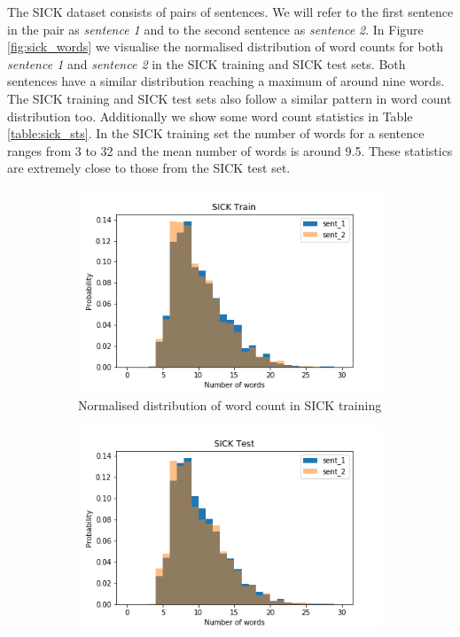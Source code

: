 \begin{enumerate}
The SICK dataset consists of pairs of sentences. We will refer to the first sentence in the pair as \emph{sentence 1} and to the second sentence as \emph{sentence 2}. In Figure \ref{fig:sick_words} we visualise the normalised distribution of word counts for both \emph{sentence 1} and \emph{sentence 2} in the SICK training and SICK test sets. Both sentences have a similar distribution reaching a maximum of around nine words. The SICK training and SICK test sets also follow a similar pattern in word count distribution too. Additionally we show some word count statistics in Table \ref{table:sick_sts}. In the SICK training set the number of words for a sentence ranges from 3 to 32 and the mean number of words is around 9.5. These statistics are extremely close to those from the SICK test set. 


\begin{figure}
	\captionsetup[subfigure]{justification=centering}
	\centering
	\begin{subfigure}[b]{.5\textwidth}
		\centering
		\includegraphics[width=\textwidth]{figures/semantic_textual_similarity/introduction/sick_train_words.png}
		\caption{Normalised distribution of word count in SICK training}
		\label{fig:sick_train_words}
	\end{subfigure}%
	\begin{subfigure}[b]{.5\textwidth}
		\centering
		\includegraphics[width=\textwidth]{figures/semantic_textual_similarity/introduction/sick_test_words.png}

\end{subfigure}
\end{figure}
\end{enumerate}

